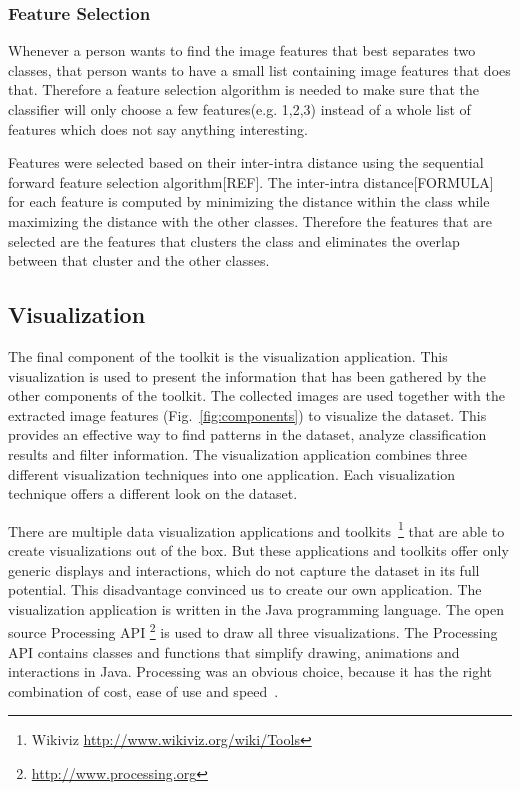 \subsubsection{Feature Selection}
Whenever a person wants to find the image features that best separates two classes, that person wants to have a small list containing image features that does that.
Therefore a feature selection algorithm is needed to make sure that the classifier will only choose a few features(e.g. 1,2,3) instead of a whole list of features which does not say anything interesting.

Features were selected based on their inter-intra distance using the sequential forward feature selection algorithm[REF].
The inter-intra distance[FORMULA] for each feature is computed by minimizing the distance within the class while maximizing the distance with the other classes.
Therefore the features that are selected are the features that clusters the class and eliminates the overlap between that cluster and the other classes.


\subsection{Visualization}
The final component of the toolkit is the visualization application.
This visualization is used to present the information that has been gathered by the other components of the toolkit.
The collected images are used together with the extracted image features (Fig.~\ref{fig:components}) to visualize the dataset.
This provides an effective way to find patterns in the dataset, analyze classification results and filter information.
The visualization application combines three different visualization techniques into one application.
Each visualization technique offers a different look on the dataset.

There are multiple data visualization applications and toolkits~\footnote{Wikiviz \url{http://www.wikiviz.org/wiki/Tools}} that are able to create visualizations out of the box.
But these applications and toolkits offer only generic displays and interactions, which do not capture the dataset in its full potential.
This disadvantage convinced us to create our own application.
The visualization application is written in the Java programming language.
The open source Processing API \footnote{\url{http://www.processing.org}} is used to draw all three visualizations.
The Processing API contains classes and functions that simplify drawing, animations and interactions in Java.
Processing was an obvious choice, because it has the right combination of cost, ease of use and speed~\cite{fry08}.

